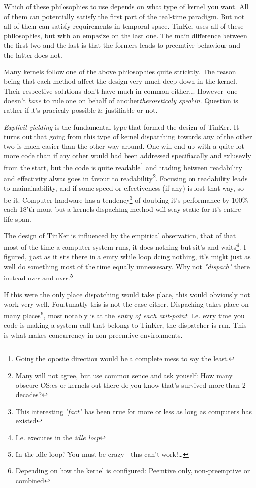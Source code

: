 Which of these philosophies to use depends on what type of kernel you want. All of them can potentially satisfy the first part of the real-time paradigm. But not all of them can satisfy requirements in temporal space. TinKer uses all of these philosophies, but with an empesize on the last one. The main difference between the first two and the last is that the formers leads to preemtive behaviour and the latter does not. 

Many kernels follow one of the above philosophies quite stricktly. The reason being that each method affect the design very much deep down in the kernel. Their respective solutions don't have much in common either\ldots. However, one doesn't \textit{have} to rule one on behalf of another\textit{theroreticaly speakin}. Question is rather if it's pracicaly possible \& justifiable or not. 

\textit{Explicit yielding} is the fundamental type that formed the design of TinKer. It turns out that going from this type of kernel dispatching towards any of the other two is much easier than the other way around. One will end up with a quite lot more code than if any other would had been addressed specifiacally and exlusevly from the start, but the code is quite readable\footnote{Going the oposite direction would be a complete mess to say the least.} and trading between readability and effectivity alwas goes in favour to readability\footnote{Many will not agree, but use common sence and ask youself: How many obscure OS:es or kernels out there do you know that's survived more than 2 decades?}. Focusing on readability leads to mainainability, and if some speed or effectiveness (if any) is lost that way, so be it. Computer hardware has a tendency\footnote{This interesting \textit{"fact"} has been true for more or less as long as computers has existed} of doubling it's performance by 100\%  each 18'th mont but a kernels dispaching method will stay static for it's entire life span.

The design of TinKer is influenced by the  empirical observation, that of that most of the time a computer system runs, it does nothing but sit's and waits\footnote{I.e. executes in the \textit{idle loop}}. I figured, jjast as it sits there in a emty while loop doing nothing, it's might just as well do something most of the time equally unnessesary. Why not \textit{"dispach"} there instead over and over.\footnote{In the idle loop? You must be crazy - this can't work!\ldots}

If this were the only place dispatching would take place, this would obviously not work very well. Fourtunatly this is not the case either. Dispaching takes place on many places\footnote{Depending on how the kernel is configured: Peemtive only, non-preemptive or combined}, most notably is at the \textit{entry of each exit-point}. I.e. evry time you code is making a system call that belongs to TinKer, the dispatcher is run. This is what makes concurrency in non-preemtive environments.

